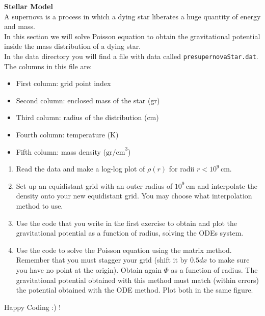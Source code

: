 \documentclass[11pt]{article}
\begin{document}
  
 \textbf{Stellar Model} \\
A supernova is a process in which a dying star liberates a huge quantity of energy and mass.\\
 In this section we will solve Poisson equation to obtain the gravitational potential inside the mass distribution of a dying star. \\
In the data directory you will find a file with data called {\tt presupernovaStar.dat}. The columns in this file are:
\begin{itemize}
\item First column: grid point index
\item Second column: enclosed mass of the star ($\text{gr}$)
\item Third column: radius of the distribution ($\text{cm}$)
\item Fourth column: temperature ($\text{K}$)
\item Fifth column: mass density ($\text{gr/cm}^3$)
\end{itemize}

\begin{enumerate}
\item Read the data and make a log-log plot of
  $\rho(r)$ for radii $r < 10^9 \,\mathrm{cm}$. 

\item Set up an equidistant grid with an outer radius of
  $10^9\,\mathrm{cm}$ and interpolate the density onto your new
  equidistant grid. You may choose what interpolation method to
  use.

\item Use the code that you write in the first exercise to obtain and plot 
the gravitational potential as a function of radius, solving the ODEs system.

\item Use the code to solve the Poisson equation using the matrix method.
Remember that you must stagger your
grid (shift it by $0.5 dx$ to make sure you have no point at the origin).
Obtain again $\Phi$ as a function of radius. The gravitational potential obtained
with this method must match (within errors) the potential obtained with
the ODE method.  Plot both in the same figure. 

\end{enumerate}

Happy Coding :) !
\end{document}
